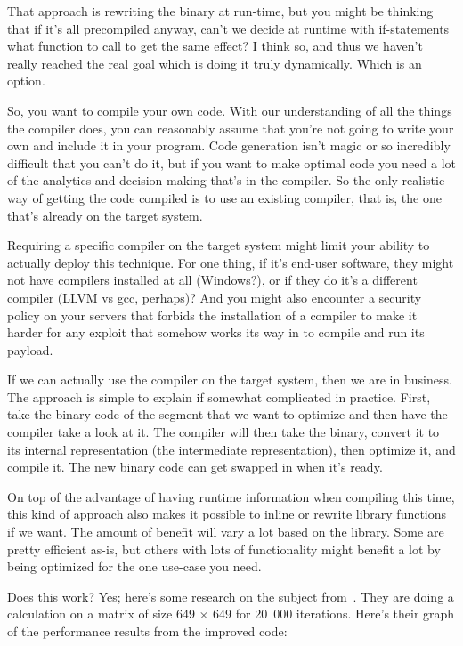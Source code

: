 \documentclass[a4paper]{report}
\begin{document}
That approach is rewriting the binary at run-time, but you might be thinking that if it's all precompiled anyway, can't we decide at runtime with if-statements what function to call to get the same effect? I think so, and thus we haven't really reached the real goal which is doing it truly dynamically. Which is an option.

So, you want to compile your own code. With our understanding of all the things the compiler does, you can reasonably assume that you're not going to write your own and include it in your program. Code generation isn't magic or so incredibly difficult that you can't do it, but if you want to make optimal code you need a lot of the analytics and decision-making that's in the compiler. So the only realistic way of getting the code compiled is to use an existing compiler, that is, the one that's already on the target system.

Requiring a specific compiler on the target system might limit your ability to actually deploy this technique. For one thing, if it's end-user software, they might not have compilers installed at all (Windows?), or if they do it's a different compiler (LLVM vs gcc, perhaps)? And you might also encounter a security policy on your servers that forbids the installation of a compiler to make it harder for any exploit that somehow works its way in to compile and run its payload.

If we can actually use the compiler on the target system, then we are in business. The approach is simple to explain if somewhat complicated in practice. First, take the binary code of the segment that we want to optimize and then have the compiler take a look at it. The compiler will then take the binary, convert it to its internal representation (the intermediate representation), then optimize it, and compile it. The new binary code can get swapped in when it's ready.

On top of the advantage of having runtime information when compiling this time, this kind of approach also makes it possible to inline or rewrite library functions if we want. The amount of benefit will vary a lot based on the library. Some are pretty efficient as-is, but others with lots of functionality might benefit a lot by being optimized for the one use-case you need.

Does this work? Yes; here's some research on the subject from~\cite{binaryrewriting}. They are doing a calculation on a matrix of size 649 $\times$ 649 for 20~000 iterations. Here's their graph of the performance results from the improved code:
\end{document}
